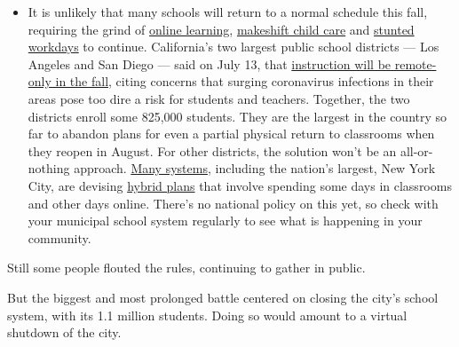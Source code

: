 \begin{itemize}
  \begin{itemize}
  \tightlist
  \item
    It is unlikely that many schools will return to a normal schedule
    this fall, requiring the grind of
    \href{https://www.nytimes3xbfgragh.onion/2020/06/05/us/coronavirus-education-lost-learning.html?action=click\&pgtype=Article\&state=default\&region=MAIN_CONTENT_3\&context=storylines_faq}{online
    learning},
    \href{https://www.nytimes3xbfgragh.onion/2020/05/29/us/coronavirus-child-care-centers.html?action=click\&pgtype=Article\&state=default\&region=MAIN_CONTENT_3\&context=storylines_faq}{makeshift
    child care} and
    \href{https://www.nytimes3xbfgragh.onion/2020/06/03/business/economy/coronavirus-working-women.html?action=click\&pgtype=Article\&state=default\&region=MAIN_CONTENT_3\&context=storylines_faq}{stunted
    workdays} to continue. California's two largest public school
    districts --- Los Angeles and San Diego --- said on July 13, that
    \href{https://www.nytimes3xbfgragh.onion/2020/07/13/us/lausd-san-diego-school-reopening.html?action=click\&pgtype=Article\&state=default\&region=MAIN_CONTENT_3\&context=storylines_faq}{instruction
    will be remote-only in the fall}, citing concerns that surging
    coronavirus infections in their areas pose too dire a risk for
    students and teachers. Together, the two districts enroll some
    825,000 students. They are the largest in the country so far to
    abandon plans for even a partial physical return to classrooms when
    they reopen in August. For other districts, the solution won't be an
    all-or-nothing approach.
    \href{https://bioethics.jhu.edu/research-and-outreach/projects/eschool-initiative/school-policy-tracker/}{Many
    systems}, including the nation's largest, New York City, are
    devising
    \href{https://www.nytimes3xbfgragh.onion/2020/06/26/us/coronavirus-schools-reopen-fall.html?action=click\&pgtype=Article\&state=default\&region=MAIN_CONTENT_3\&context=storylines_faq}{hybrid
    plans} that involve spending some days in classrooms and other days
    online. There's no national policy on this yet, so check with your
    municipal school system regularly to see what is happening in your
    community.
  \end{itemize}
\end{itemize}

Still some people flouted the rules, continuing to gather in public.

But the biggest and most prolonged battle centered on closing the city's
school system, with its 1.1 million students. Doing so would amount to a
virtual shutdown of the city.

